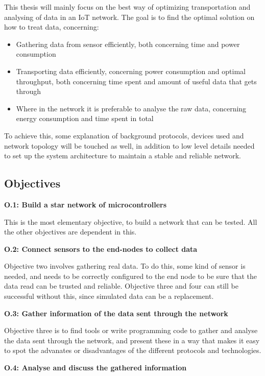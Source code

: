 This thesis will mainly focus on the best way of optimizing transportation and analysing of data in an IoT network. The goal is to find the optimal solution on how to treat data, concerning:

\begin{itemize}
	\item Gathering data from sensor efficiently, both concerning time and power consumption
	\item Transporting data efficiently, concerning power consumption and optimal throughput, both concerning time spent and amount of useful data that gets through
	\item Where in the network it is preferable to analyse the raw data, concerning energy consumption and time spent in total
\end{itemize}

To achieve this, some explanation of background protocols, devices used and network topology will be touched as well, in addition to low level details needed to set up the system architecture to maintain a stable and reliable network. 


\subsection{Objectives}

\noindent \textbf{O.1: Build a star network of microcontrollers}

This is the most elementary objective, to build a network that can be tested. All the other objectives are dependent in this.  

\noindent\textbf{O.2: Connect sensors to the end-nodes to collect data}

Objective two involves gathering real data. To do this, some kind of sensor is needed, and needs to be correctly configured to the end node to be sure that the data read can be trusted and reliable. Objective three and four can still be successful without this, since simulated data can be a replacement.  

\noindent\textbf{O.3: Gather information of the data sent through the network}

Objective three is to find tools or write programming code to gather and analyse the data sent through the network, and present these in a way that makes it easy to spot the advanates or disadvantages of the different protocols and technologies. 

\noindent\textbf{O.4: Analyse and discuss the gathered information}

